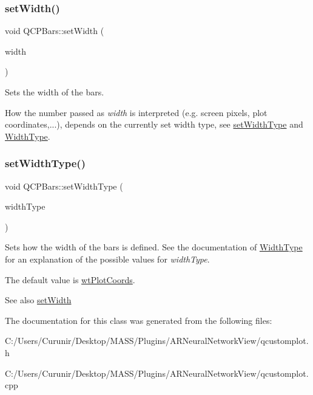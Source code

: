 \subsubsection{\texorpdfstring{set\+Width()}{setWidth()}}
{\footnotesize\ttfamily void Q\+C\+P\+Bars\+::set\+Width (\begin{DoxyParamCaption}\item[{double}]{width }\end{DoxyParamCaption})}

Sets the width of the bars.

How the number passed as {\itshape width} is interpreted (e.\+g. screen pixels, plot coordinates,...), depends on the currently set width type, see \hyperlink{class_q_c_p_bars_adcaa3b41281bb2c0f7949b341592fcc0}{set\+Width\+Type} and \hyperlink{class_q_c_p_bars_a65dbbf1ab41cbe993d71521096ed4649}{Width\+Type}. \mbox{\label{class_q_c_p_bars_adcaa3b41281bb2c0f7949b341592fcc0}} 
\subsubsection{\texorpdfstring{set\+Width\+Type()}{setWidthType()}}
{\footnotesize\ttfamily void Q\+C\+P\+Bars\+::set\+Width\+Type (\begin{DoxyParamCaption}\item[{\hyperlink{class_q_c_p_bars_a65dbbf1ab41cbe993d71521096ed4649}{Q\+C\+P\+Bars\+::\+Width\+Type}}]{width\+Type }\end{DoxyParamCaption})}

Sets how the width of the bars is defined. See the documentation of \hyperlink{class_q_c_p_bars_a65dbbf1ab41cbe993d71521096ed4649}{Width\+Type} for an explanation of the possible values for {\itshape width\+Type}.

The default value is \hyperlink{class_q_c_p_bars_a65dbbf1ab41cbe993d71521096ed4649a67f08c8d84085b506a42e7d85d14589a}{wt\+Plot\+Coords}.

\begin{DoxySeeAlso}{See also}
\hyperlink{class_q_c_p_bars_afec6116579d44d5b706e0fa5e5332507}{set\+Width} 
\end{DoxySeeAlso}


The documentation for this class was generated from the following files\+:\begin{DoxyCompactItemize}
\item 
C\+:/\+Users/\+Curunir/\+Desktop/\+M\+A\+S\+S/\+Plugins/\+A\+R\+Neural\+Network\+View/qcustomplot.\+h\item 
C\+:/\+Users/\+Curunir/\+Desktop/\+M\+A\+S\+S/\+Plugins/\+A\+R\+Neural\+Network\+View/qcustomplot.\+cpp\end{DoxyCompactItemize}
